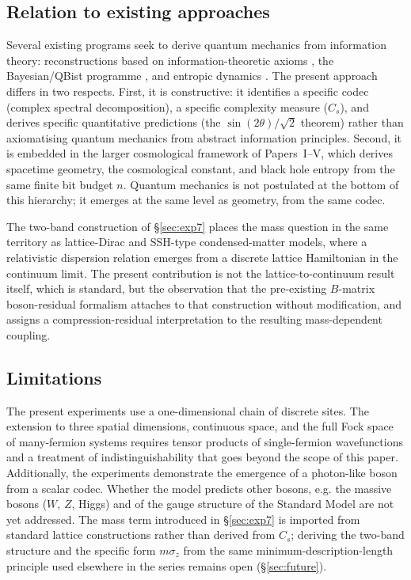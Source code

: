 \documentclass[11pt]{article}
\begin{document}
\subsection{Relation to existing approaches}

Several existing programs seek to derive quantum mechanics from information
theory: reconstructions based on information-theoretic axioms
\cite{hardy2001, chiribella2011}, the Bayesian/QBist programme
\cite{fuchs2014}, and entropic dynamics \cite{caticha2019}.
The present approach differs in two respects.
First, it is constructive: it identifies a specific codec (complex spectral
decomposition), a specific complexity measure ($C_s$), and derives specific
quantitative predictions (the $\sin(2\theta)/\sqrt{2}$ theorem) rather than
axiomatising quantum mechanics from abstract information principles.
Second, it is embedded in the larger cosmological framework of Papers~I--V,
which derives spacetime geometry, the cosmological constant, and black hole
entropy from the same finite bit budget $n$.
Quantum mechanics is not postulated at the bottom of this hierarchy;
it emerges at the same level as geometry, from the same codec.

The two-band construction of \S\ref{sec:exp7} places the mass question in
the same territory as lattice-Dirac and SSH-type condensed-matter models,
where a relativistic dispersion relation emerges from a discrete lattice
Hamiltonian in the continuum limit. The present contribution is not the
lattice-to-continuum result itself, which is standard, but the observation
that the pre-existing $B$-matrix boson-residual formalism attaches to that
construction without modification, and assigns a compression-residual
interpretation to the resulting mass-dependent coupling.

\subsection{Limitations}

The present experiments use a one-dimensional chain of discrete sites.
The extension to three spatial dimensions, continuous space, and the full
Fock space of many-fermion systems requires tensor products of single-fermion
wavefunctions and a treatment of indistinguishability that goes beyond the
scope of this paper.
Additionally, the experiments demonstrate the emergence of a photon-like
boson from a scalar codec. Whether the model predicts other bosons, e.g. the
massive bosons ($W$, $Z$, Higgs) and of the gauge structure of the Standard Model
are not yet addressed.
The mass term introduced in \S\ref{sec:exp7} is imported from standard
lattice constructions rather than derived from $C_s$; deriving the two-band
structure and the specific form $m\sigma_z$ from the same minimum-description-length
principle used elsewhere in the series remains open (\S\ref{sec:future}).
\end{document}
